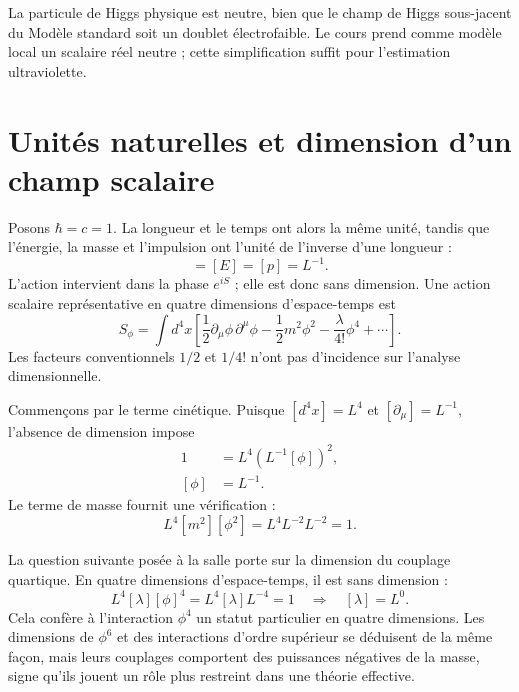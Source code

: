 La particule de Higgs physique est neutre, bien que le champ de Higgs sous-jacent du Modèle standard soit un doublet électrofaible. Le cours prend comme modèle local un scalaire réel neutre ; cette simplification suffit pour l’estimation ultraviolette.

\section{Unités naturelles et dimension d’un champ scalaire}

Posons \(\hbar=c=1\). La longueur et le temps ont alors la même unité, tandis que l’énergie, la masse et l’impulsion ont l’unité de l’inverse d’une longueur :
\begin{equation}
[m]=[E]=[p]=L^{-1}.
\end{equation}
L’action intervient dans la phase \(e^{iS}\) ; elle est donc sans dimension. Une action scalaire représentative en quatre dimensions d’espace-temps est
\begin{equation}
S_\phi=\int d^4x\left[
\frac12\partial_\mu\phi\,\partial^\mu\phi
-\frac12m^2\phi^2
-\frac{\lambda}{4!}\phi^4
+\cdots\right].
\end{equation}
Les facteurs conventionnels \(1/2\) et \(1/4!\) n’ont pas d’incidence sur l’analyse dimensionnelle.

Commençons par le terme cinétique. Puisque \([d^4x]=L^4\) et \([\partial_\mu]=L^{-1}\), l’absence de dimension impose
\begin{align}
1
&=L^4\left(L^{-1}[\phi]\right)^2,\\
[\phi]&=L^{-1}.
\end{align}
Le terme de masse fournit une vérification :
\begin{equation}
L^4[m^2][\phi^2]
=L^4L^{-2}L^{-2}=1.
\end{equation}

La question suivante posée à la salle porte sur la dimension du couplage quartique. En quatre dimensions d’espace-temps, il est sans dimension :
\begin{equation}
L^4[\lambda][\phi]^4=L^4[\lambda]L^{-4}=1
\quad\Longrightarrow\quad [\lambda]=L^0.
\end{equation}
Cela confère à l’interaction \(\phi^4\) un statut particulier en quatre dimensions. Les dimensions de \(\phi^6\) et des interactions d’ordre supérieur se déduisent de la même façon, mais leurs couplages comportent des puissances négatives de la masse, signe qu’ils jouent un rôle plus restreint dans une théorie effective.

